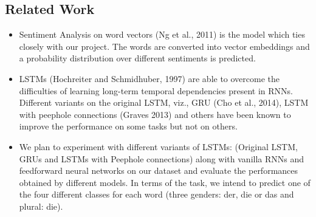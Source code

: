 \documentclass[10pt,twocolumn,letterpaper]{article}
\begin{document}
    \subsection{Related Work}
        \begin{itemize}
            \item Sentiment Analysis on word vectors (Ng et al., 2011) is the model which ties closely with our project. The words are converted into vector embeddings and a probability distribution over different sentiments is predicted. 
            
            \item LSTMs (Hochreiter and Schmidhuber, 1997) are able to overcome the difficulties of learning long-term temporal dependencies present in RNNs. Different variants on the original LSTM, viz., GRU (Cho et al., 2014), LSTM with peephole connections (Graves 2013) and others have been known to improve the performance on some tasks but not on others.
            \item We plan to experiment with different variants of LSTMs: (Original LSTM, GRUs and LSTMs with Peephole connections) along with vanilla RNNs and feedforward neural networks on our dataset and evaluate the performances obtained by different models. In terms of the task, we intend to predict one of the four different classes for each word (three genders: der, die or das and plural: die).
        \end{itemize}
\end{document}
